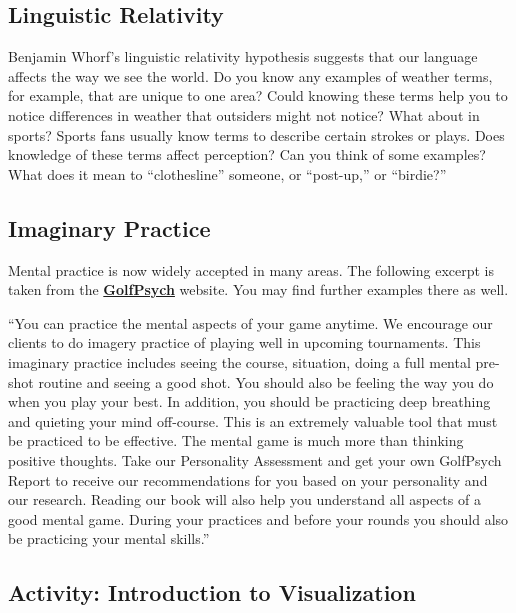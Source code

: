 \documentclass[
]{book}
\begin{document}
\hypertarget{linguistic-relativity}{%
\subsection*{Linguistic Relativity}\label{linguistic-relativity}}

Benjamin Whorf's linguistic relativity hypothesis suggests that our language affects the way we see the world. Do you know any examples of weather terms, for example, that are unique to one area? Could knowing these terms help you to notice differences in weather that outsiders might not notice? What about in sports? Sports fans usually know terms to de­scribe certain strokes or plays. Does knowledge of these terms affect percep­tion? Can you think of some examples? What does it mean to ``clothesline'' someone, or ``post-up,'' or ``birdie?''

\hypertarget{imaginary-practice}{%
\subsection*{Imaginary Practice}\label{imaginary-practice}}

Mental practice is now widely accepted in many areas. The following excerpt is taken from the \href{https://www.golfpsych.com}{\textbf{GolfPsych}} website. You may find further examples there as well.

``You can practice the mental aspects of your game anytime. We encourage our clients to do imagery practice of playing well in upcoming tournaments. This imaginary practice includes seeing the course, situation, doing a full mental pre-shot routine and seeing a good shot. You should also be feeling the way you do when you play your best. In addition, you should be practicing deep breathing and quieting your mind off-course. This is an extremely valuable tool that must be practiced to be effective. The mental game is much more than thinking positive thoughts. Take our Personality Assessment and get your own GolfPsych Report to receive our recommendations for you based on your personality and our research. Reading our book will also help you understand all aspects of a good mental game. During your practices and before your rounds you should also be practicing your mental skills.''

\hypertarget{activity-introduction-to-visualization}{%
\subsection*{Activity: Introduction to Visualization}\label{activity-introduction-to-visualization}}
\end{document}
